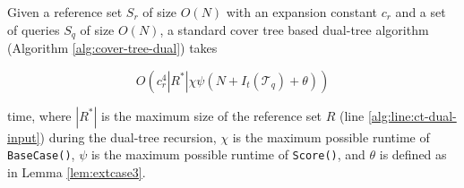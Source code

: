 \begin{thm}
\label{thm:ct-runtime}
Given a reference set $S_r$ of size $O(N)$ with an expansion constant $c_r$ and a
set of queries $S_q$ of size $O(N)$, a standard cover tree based dual-tree
algorithm (Algorithm \ref{alg:cover-tree-dual}) takes

\begin{equation}
O\left(c_r^4 | R^* | \chi \psi (N + I_t(\mathscr{T}_q) + \theta)\right)
\end{equation}

\noindent time, where $ | R^* | $ is the maximum size of the reference set $R$
(line \ref{alg:line:ct-dual-input}) during the dual-tree recursion, $\chi$ is
the maximum possible runtime of \texttt{BaseCase()}, $\psi$ is the maximum
possible runtime of \texttt{Score()}, and $\theta$ is defined as in Lemma
\ref{lem:extcase3}.
\end{thm}

